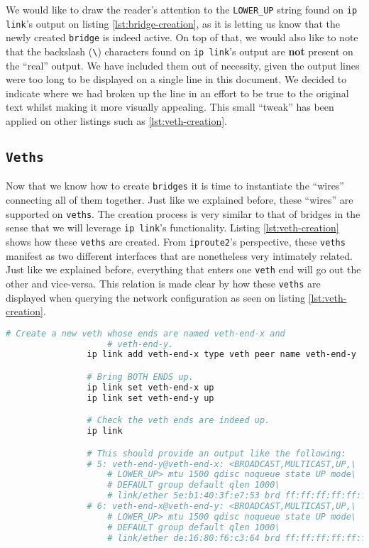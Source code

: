             We would like to draw the reader's attention to the \texttt{LOWER\_UP} string found on \texttt{ip link}'s output on listing \ref{lst:bridge-creation}, as it is letting us know that the newly created \texttt{bridge} is indeed active. On top of that, we would also like to note that the backslash (\texttt{\textbackslash}) characters found on \texttt{ip link}'s output are \textbf{not} present on the ``real'' output. We have included them out of necessity, given the output lines were too long to be displayed on a single line in this document. We decided to indicate where we had broken up the line in an effort to be true to the original text whilst making it more visually appealing. This small ``tweak'' has been applied on other listings such as \ref{lst:veth-creation}.\\

        \subsection{\texttt{Veths}}
            Now that we know how to create \texttt{bridges} it is time to instantiate the ``wires'' connecting all of them together. Just like we explained before, these ``wires'' are supported on \texttt{veths}. The creation process is very similar to that of bridges in the sense that we will leverage \texttt{ip link}'s functionality. Listing \ref{lst:veth-creation} shows how these \texttt{veths} are created. From \texttt{iproute2}'s perspective, these \texttt{veths} manifest as two different interfaces that are nonetheless very intimately related. Just like we explained before, everything that enters one \texttt{veth} end will go out the other and vice-versa. This relation is made clear by how these \texttt{veths} are displayed when querying the network configuration as seen on listing \ref{lst:veth-creation}.\\

            \begin{lstlisting}[language = bash, caption = Instantiating a Virtual Ethernet Interface., label = lst:veth-creation]
                # Create a new veth whose ends are named veth-end-x and
                    # veth-end-y.
                ip link add veth-end-x type veth peer name veth-end-y

                # Bring BOTH ENDS up.
                ip link set veth-end-x up
                ip link set veth-end-y up

                # Check the veth ends are indeed up.
                ip link

                # This should provide an output like the following:
                # 5: veth-end-y@veth-end-x: <BROADCAST,MULTICAST,UP,\
                    # LOWER_UP> mtu 1500 qdisc noqueue state UP mode\
                    # DEFAULT group default qlen 1000\
                    # link/ether 5e:b1:40:3f:e7:53 brd ff:ff:ff:ff:ff:ff
                # 6: veth-end-x@veth-end-y: <BROADCAST,MULTICAST,UP,\
                    # LOWER_UP> mtu 1500 qdisc noqueue state UP mode\
                    # DEFAULT group default qlen 1000\
                    # link/ether de:16:80:f6:c3:64 brd ff:ff:ff:ff:ff:ff
            \end{lstlisting}


